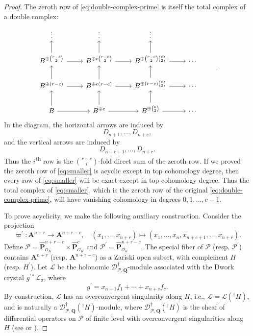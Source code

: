 \documentclass[10pt,a4paper]{amsart}
\numberwithin{equation}{section}
\renewcommand{\mathbb}{\mathbf}
\theoremstyle{plain}
\theoremstyle{definition}
\theoremstyle{plain}
\begin{document}
\begin{proof}
The zeroth row of \eqref{eq:double-complex-prime} is itself the total
complex of a double complex:
\begin{equation}\label{eq:smaller}
\begin{tikzcd}
\vdots & \vdots & \vdots \\
B^{\oplus \binom{r-c}{2}} \ar{r} \ar{u} & B^{\oplus c\binom{r-c}{2}} \ar{r} \ar{u} & B^{\oplus\binom{r-c}{2}\binom{c}{2}} \ar{r}\ar{u} &\cdots \\
B^{\oplus (r-c)} \ar{r} \ar{u} & B^{\oplus c(r-c)} \ar{r}\ar{u} & B^{\oplus(r-c)\binom{c}{2}} \ar{r} \ar{u} &\cdots & \\
B \ar{r} \ar{u} & B^{\oplus c} \ar{r} \ar{u} & B^{\oplus \binom{c}{2}} \ar{r} \ar{u} & \cdots
\end{tikzcd}.
\end{equation}
In the diagram, the horizontal arrows are induced by
\begin{equation*}
D_{n+1},\ldots, D_{n+c},
\end{equation*}
and the vertical arrows are induced by
\begin{equation*}
D_{n+c+1},\ldots, D_{n+r}.
\end{equation*}
Thus the \(i\)\textsuperscript{th} row is the \(\binom{r-c}{i}\)-fold
direct sum of the zeroth row.  If we proved the zeroth row of
\eqref{eq:smaller} is acyclic except in top cohomology degree, then
every row of \eqref{eq:smaller} will be exact except in top cohomology
degree.  Thus the total complex of \eqref{eq:smaller}, which is the
zeroth row of the original \eqref{eq:double-complex-prime}, will have
vanishing cohomology in degrees \(0,1,\ldots,c-1\).


\medskip%
To prove acyclicity, we make the following auxiliary construction.
Consider the projection
\[
\varpi^{\prime}\colon \mathbb{A}^{n+r} \to \mathbb{A}^{n+r-c}, \quad (x_{1}, \ldots, x_{n+r}) \mapsto (x_{1}, \ldots, x_{n}, x_{n+c+1}, \ldots, x_{n+r}).
\]
Define
\(\mathcal{P} = \widehat{\mathbb{P}}^{n+r-c}_{\mathcal{O}_{K}} \times \widehat{\mathbb{P}}^{c}_{\mathcal{O}_{K}}\)
and
\(\mathcal{P}^{\prime} = \widehat{\mathbb{P}}^{n+r-c}_{\mathcal{O}_{K}}\).
The special fiber of \(\mathcal{P}\) (resp. \(\mathcal{P}^{\prime}\))
contains \(\mathbb{A}^{n+r}\) (resp. \(\mathbb{A}^{n+r-c}\)) as a
Zariski open subset, with complement \(H\) (resp. \(H^{\prime}\)).
Let \(\mathcal{L}\) be the holonomic
\(\mathscr{D}^{\dagger}_{\mathcal{P}, \mathbb{Q}}\)-module associated
with the Dwork crystal \(g^{\prime\ast}\mathcal{L}_{\pi}\), where
\[
g^{\prime} = x_{n+1} f_{1} + \cdots + x_{n+c} f_{c}.
\]
By construction, \(\mathcal{L}\) has an overconvergent singularity
along \(H\), i.e., \(\mathcal{L} = \mathcal{L}({}^{\dagger}H)\), and
is naturally a
\(\mathscr{D}^{\dagger}_{\mathcal{P},\mathbb{Q}}({}^{\dagger}H)\)-module,
where
\(\mathscr{D}^{\dagger}_{\mathcal{P},\mathbb{Q}}({}^{\dagger}H)\) is
the sheaf of differential operators on \(\mathcal{P}\) of finite level
with overconvergent singularities along \(H\)
(see \cite[\S4.2.5]{berthelot:arithmetic-d-modules-1-differential-operators-of-finite-level} or
\cite[\S2.5]{baldassarri-berthelot:dwork-cohomology-for-singular-hypersurfaces}).


\end{proof}
\end{document}
